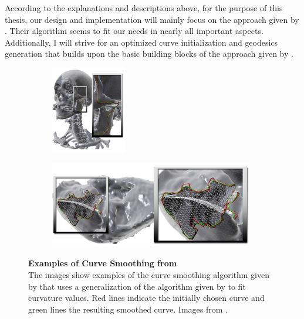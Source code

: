 \documentclass{stdlocal}
\begin{document}
According to the explanations and descriptions above, for the purpose of this thesis, our design and implementation will mainly focus on the approach given by \textcite{lawonn2014}.
Their algorithm seems to fit our needs in nearly all important aspects.
Additionally, I will strive for an optimized curve initialization and geodesics generation that builds upon the basic building blocks of the approach given by \textcite{mancinelli2022}.

\begin{figure}[t]
  \centering
  \begin{subfigure}[b]{0.29\linewidth}
    \centering
    \includegraphics[height=3.8cm]{images/lawonn2014-1.png}
  \end{subfigure}
  \begin{subfigure}[b]{0.69\linewidth}
    \centering
    \includegraphics[height=3.8cm]{images/lawonn2014-2.png}
  \end{subfigure}
  \caption[Examples of Curve Smoothing from \textcite{lawonn2014}]{%
    \textbf{Examples of Curve Smoothing from \textcite{lawonn2014}}\\
    The images show examples of the curve smoothing algorithm given by \textcite{lawonn2014} that uses a generalization of the algorithm given by \textcite{martinez2005} to fit curvature values.
    Red lines indicate the initially chosen curve and green lines the resulting smoothed curve.
    Images from \textcite{lawonn2014}.
  }
  \label{fig:lawonn2014}
\end{figure}



\end{document}
